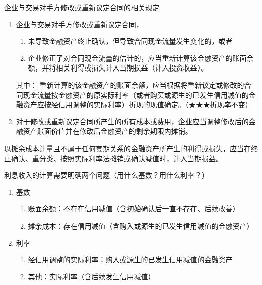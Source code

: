 \documentclass[UTF8,12pt]{ctexart}
\numberwithin{equation}{section} %
\numberwithin{figure}{section}
\numberwithin{table}{section}
\begin{document}
	企业与交易对手方修改或重新议定合同的相关规定
	\begin{enumerate}
		\item 企业与交易对手方修改或重新议定合同，
		\begin{enumerate}
			\item 未导致金融资产终止确认，但导致合同现金流量发生变化的，或者
			
			\item 企业修正了对合同现金流量的估计的，应当重新计算该金融资产的账面余额，并将相关利得或损失计入当期损益（计入投资收益）。
		\end{enumerate}
		其中：
		重新计算的该金融资产的账面余额，应当根据将重新议定或修改的合同现金流量按金融资产的原实际利率（或者购买或源生的已发生信用减值的金融资产应按经信用调整的实际利率）折现的现值确定。（★★★折现率不变）
		
		\item 对于修改或重新议定合同所产生的所有成本或费用，企业应当调整修改后的金融资产账面价值并在修改后金融资产的剩余期限内摊销。
	\end{enumerate}
	
	以摊余成本计量且不属于任何套期关系的金融资产所产生的利得或损失，应当在终止确认、重分类、按照实际利率法摊销或确认减值时，计入当期损益。
	
	利息收入的计算需要明确两个问题（用什么基数？用什么利率？）
	\begin{enumerate}
		\item 基数
		\begin{enumerate}
			\item 账面余额：不存在信用减值（含初始确认后一直不存在、后续改善）
			
			\item 摊余成本：存在信用减值（含购入或源生的已发生信用减值的金融资产）
		\end{enumerate}
		
		\item 利率
		\begin{enumerate}
			\item 经信用调整的实际利率：购入或源生的已发生信用减值的金融资产
			
			\item 其他：实际利率（含后续发生信用减值）
		\end{enumerate}
	\end{enumerate}
\end{document}
